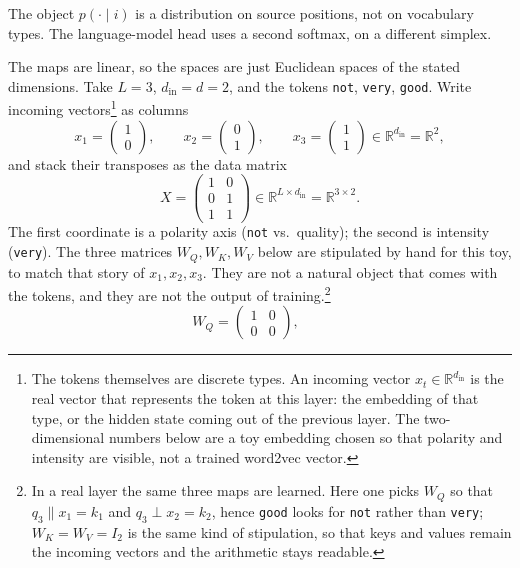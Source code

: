 \documentclass[11pt,a4paper]{article}
\theoremstyle{definition}
\begin{document}
\begin{remark}
The object \(p(\cdot\mid i)\) is a distribution on source positions, not on vocabulary types. The language-model head uses a second softmax, on a different simplex.
\end{remark}

\begin{example}
The maps are linear, so the spaces are just Euclidean spaces of the stated dimensions. Take \(L=3\), \(d_{\mathrm{in}}=d=2\), and the tokens \texttt{not}, \texttt{very}, \texttt{good}. Write incoming vectors\footnote{The tokens themselves are discrete types. An incoming vector \(x_t\in\mathbb{R}^{d_{\mathrm{in}}}\) is the real vector that represents the token at this layer: the embedding of that type, or the hidden state coming out of the previous layer. The two-dimensional numbers below are a toy embedding chosen so that polarity and intensity are visible, not a trained word2vec vector.} as columns
\[
x_1=\begin{pmatrix}1\\0\end{pmatrix},\qquad
x_2=\begin{pmatrix}0\\1\end{pmatrix},\qquad
x_3=\begin{pmatrix}1\\1\end{pmatrix}
\in\mathbb{R}^{d_{\mathrm{in}}}=\mathbb{R}^2,
\]
and stack their transposes as the data matrix
\[
X=\begin{pmatrix}1&0\\0&1\\1&1\end{pmatrix}\in\mathbb{R}^{L\times d_{\mathrm{in}}}=\mathbb{R}^{3\times 2}.
\]
The first coordinate is a polarity axis (\texttt{not} vs.\ quality); the second is intensity (\texttt{very}). The three matrices \(W_Q,W_K,W_V\) below are stipulated by hand for this toy, to match that story of \(x_1,x_2,x_3\). They are not a natural object that comes with the tokens, and they are not the output of training.\footnote{In a real layer the same three maps are learned. Here one picks \(W_Q\) so that \(q_3\parallel x_1=k_1\) and \(q_3\perp x_2=k_2\), hence \texttt{good} looks for \texttt{not} rather than \texttt{very}; \(W_K=W_V=I_2\) is the same kind of stipulation, so that keys and values remain the incoming vectors and the arithmetic stays readable.}
\[
W_Q=\begin{pmatrix}1&0\\0&0\end{pmatrix},\qquad
\]
\end{example}
\end{document}
